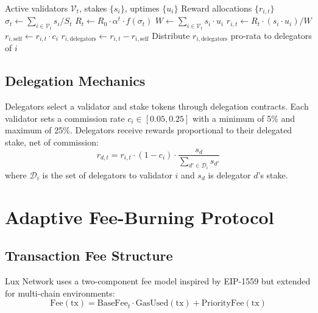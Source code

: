 \documentclass[11pt,a4paper]{article}
\begin{document}
\begin{algorithm}[H]
\caption{Per-Epoch Reward Distribution}
\label{alg:reward}
\begin{algorithmic}[1]
\Require Active validators $\mathcal{V}_t$, stakes $\{s_i\}$, uptimes $\{u_i\}$
\Ensure Reward allocations $\{r_{i,t}\}$
\State $\sigma_t \gets \sum_{i \in \mathcal{V}_t} s_i / S_t$
\State $R_t \gets R_0 \cdot \alpha^t \cdot f(\sigma_t)$
\State $W \gets \sum_{i \in \mathcal{V}_t} s_i \cdot u_i$
    \State $r_{i,t} \gets R_t \cdot (s_i \cdot u_i) / W$
    \State $r_{i,\text{self}} \gets r_{i,t} \cdot c_i$ 
    \State $r_{i,\text{delegators}} \gets r_{i,t} - r_{i,\text{self}}$ 
    \State Distribute $r_{i,\text{delegators}}$ pro-rata to delegators of $i$
\EndFor
\end{algorithmic}
\end{algorithm}

\subsection{Delegation Mechanics}

Delegators select a validator and stake tokens through delegation contracts. Each validator sets a commission rate $c_i \in [0.05, 0.25]$ with a minimum of 5\% and maximum of 25\%. Delegators receive rewards proportional to their delegated stake, net of commission:
\begin{equation}
    r_{d,t} = r_{i,t} \cdot (1 - c_i) \cdot \frac{s_d}{\sum_{d' \in \mathcal{D}_i} s_{d'}}
\end{equation}
where $\mathcal{D}_i$ is the set of delegators to validator $i$ and $s_d$ is delegator $d$'s stake.

\section{Adaptive Fee-Burning Protocol}\label{sec:fees}

\subsection{Transaction Fee Structure}

Lux Network uses a two-component fee model inspired by EIP-1559 \cite{roughgarden2020eip1559} but extended for multi-chain environments:
\begin{equation}
    \text{Fee}(\text{tx}) = \text{BaseFee}_t \cdot \text{GasUsed}(\text{tx}) + \text{PriorityFee}(\text{tx})
\end{equation}
\end{document}
